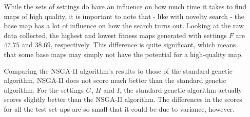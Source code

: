 While the sets of settings do have an influence on how much time it takes to find maps of high quality, it is important to note that - like with novelty search - the base map has a lot of influence on how the search turns out. Looking at the raw data collected, the highest and lowest fitness maps generated with settings $F$ are $47.75$ and $38.69$, respectively. This difference is quite significant, which means that some base maps may simply not have the potential for a high-quality map.

Comparing the  NSGA-II algorithm's results to those of the standard genetic algorithm, NSGA-II does not score much better than the standard genetic algorithm. For the settings $G$, $H$ and $I$, the standard genetic algorithm actually scores slightly better than the NSGA-II algorithm. The differences in the scores for all the test set-ups are so small that it could be due to variance, however.

\begin{table}[!h]
	\begin{center}
	\renewcommand{\arraystretch}{1}
	\caption{Results of NSGA-II seeded with highest fitness novel individuals.}
	\label{tab:results_novelmoeahighfitness}
	\end{center}
\end{table}


